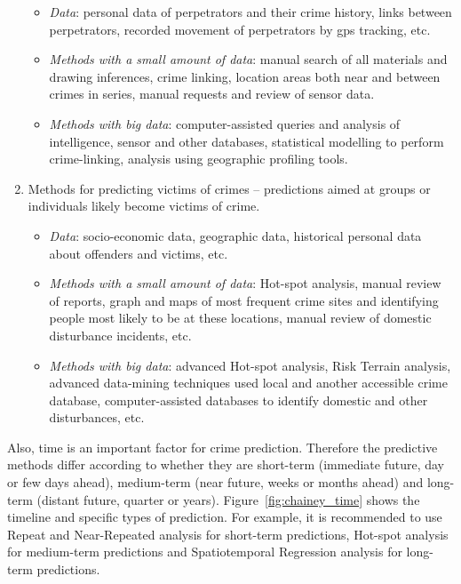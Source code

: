 \documentclass[thesis=M,english]{FITthesis}[2012/10/20]
\begin{document}
\begin{enumerate}
        \begin{itemize}
            \item \textit{Data}: personal data of perpetrators and their crime history, links between perpetrators, recorded movement of perpetrators by \gls{gps} tracking, etc.
            \item \textit{Methods with a small amount of data}: manual search of all materials and drawing inferences, crime linking, location areas both near and between crimes in series, manual requests and review of sensor data.
            \item \textit{Methods with big data}: computer-assisted queries and analysis of intelligence, sensor and other databases, statistical modelling to perform crime-linking, analysis using geographic profiling tools.
        \end{itemize}
    \item Methods for predicting victims of crimes -- predictions aimed at groups or individuals likely become victims of crime.
        \begin{itemize}
            \item \textit{Data}: socio-economic data, geographic data, historical personal data about offenders and victims, etc.
            \item \textit{Methods with a small amount of data}: Hot-spot analysis, manual review of reports, graph and maps of most frequent crime sites and identifying people most likely to be at these locations, manual review of domestic disturbance incidents, etc.
            \item \textit{Methods with big data}: advanced Hot-spot analysis, Risk Terrain analysis, advanced data-mining techniques used local and another accessible crime database, computer-assisted databases to identify domestic and other disturbances, etc.
        \end{itemize}
\end{enumerate}

Also, time is an important factor for crime prediction. Therefore the predictive methods differ according to whether they are short-term (immediate future, day or few days ahead), medium-term (near future, weeks or months ahead) and long-term (distant future, quarter or years)\cite[42]{Chainey2015maps}. Figure~\ref{fig:chainey_time} shows the timeline and specific types of prediction. For example, it is recommended to use Repeat and Near-Repeated analysis for short-term predictions, Hot-spot analysis for medium-term predictions and Spatiotemporal Regression analysis for long-term predictions.
\end{document}
